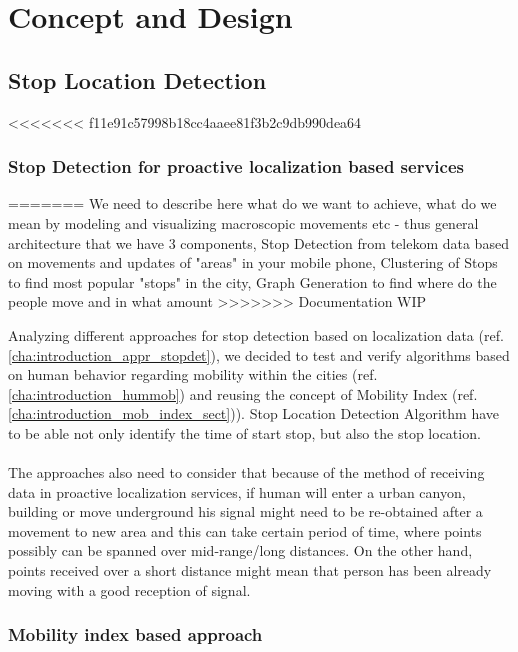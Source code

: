 \chapter{Concept and Design}
\label{cha:conceptanddesign}

\section{Stop Location Detection}

<<<<<<< f11e91c57998b18cc4aaee81f3b2c9db990dea64
\subsection{Stop Detection for proactive localization based services}
\label{cha:stopdet_proactive}
=======
We need to describe here what do we want to achieve, what do we mean by modeling and visualizing macroscopic movements etc - thus general architecture that we have 3 components, Stop Detection from telekom data based on movements and updates of "areas" in your mobile phone, Clustering of Stops to find most popular "stops" in the city, Graph Generation to find where do the people move and in what amount
>>>>>>> Documentation WIP

Analyzing different approaches for stop detection based on localization data (ref. \autoref{cha:introduction_appr_stopdet}), we decided to test and verify algorithms based on human behavior regarding mobility within the cities (ref. \autoref{cha:introduction_hummob}) and reusing the concept of Mobility Index (ref. \autoref{cha:introduction_mob_index_sect})). Stop Location Detection Algorithm have to be able not only identify the time of start stop, but also the stop location.
\\\\
The approaches also need to consider that because of the method of receiving data in proactive localization services, if human will enter a urban canyon, building or move underground his signal might need to be re-obtained after a movement to new area and this can take certain period of time, where points possibly can be spanned over mid-range/long distances. On the other hand, points received over a short distance might mean that person has been already moving with a good reception of signal.

\subsection{Mobility index based approach}
\label{cha:stopdet_mi}

